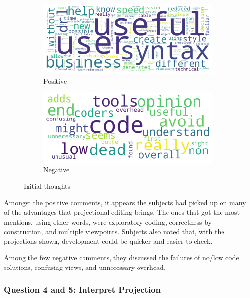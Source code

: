 \begin{figure}[h]
    \begin{subfigure}{.60\textwidth}
      \centering
      \includegraphics[width=.95\linewidth]{Sections/images/positive_wordcloud.png}
      \caption{Positive}
      \label{fig:wfig1}
    \end{subfigure}%
    \begin{subfigure}{.40\textwidth}
      \centering
      \includegraphics[width=.95\linewidth]{Sections/images/negative_wordcloud.png}
      \caption{Negative}
      \label{fig:wfig2}
    \end{subfigure}
    \caption{Initial thoughts}
    \label{fig:wordclouds}
\end{figure}

Amongst the positive comments, it appears the subjects had picked up on many of the advantages that projectional editing brings.
The ones that got the most mentions, using other words, were exploratory coding, correctness by construction, and multiple viewpoints.
Subjects also noted that, with the projections shown, development could be quicker and easier to check.

Among the few negative comments, they discussed the failures of no/low code solutions, confusing views, and unnecessary overhead.

\subsubsection{Question 4 and 5: Interpret Projection}



